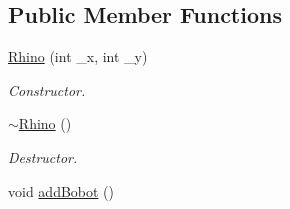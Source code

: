 \subsection*{Public Member Functions}
\begin{DoxyCompactItemize}
\item 
\hyperlink{classRhino_a58522b211956561033d02c692f8efbf0}{Rhino} (int \-\_\-x, int \-\_\-y)
\begin{DoxyCompactList}\small\item\em Constructor. \end{DoxyCompactList}\item 
\hypertarget{classRhino_a6a11f0f8dcd6ed20ef99d8d698b06f28}{\hyperlink{classRhino_a6a11f0f8dcd6ed20ef99d8d698b06f28}{$\sim$\-Rhino} ()}\label{classRhino_a6a11f0f8dcd6ed20ef99d8d698b06f28}

\begin{DoxyCompactList}\small\item\em Destructor. \end{DoxyCompactList}\item 
\hypertarget{classRhino_a83ba6ae8becb9c7aa8f7e17b9783085b}{void \hyperlink{classRhino_a83ba6ae8becb9c7aa8f7e17b9783085b}{add\-Bobot} ()}\label{classRhino_a83ba6ae8becb9c7aa8f7e17b9783085b}


\end{DoxyCompactItemize}
